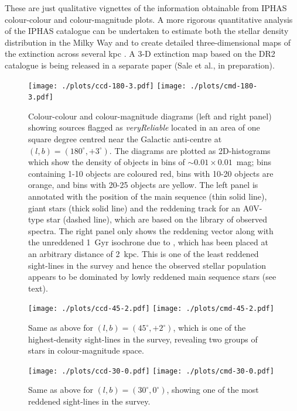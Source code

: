 \documentclass[useAMS,usenatbib]{mn2e}
\begin{document}
These are just qualitative vignettes of the information obtainable
from IPHAS colour-colour and colour-magnitude plots.
A more rigorous quantitative analysis of the IPHAS catalogue
can be undertaken to estimate both the stellar density distribution 
in the Milky Way \citep{Sale2010} and to create detailed three-dimensional 
maps of the extinction across several kpc \citep{Sale2009,Sale2012}.
A 3-D extinction map based on the DR2 catalogue
is being released in a separate paper (Sale et al., in preparation).

\begin{figure}
    \begin{minipage}[b]{\linewidth}
        \texttt{[image: ./plots/ccd-180-3.pdf]} 
        \texttt{[image: ./plots/cmd-180-3.pdf]}
    \end{minipage}
    \caption{Colour-colour and colour-magnitude diagrams
    (left and right panel)
    showing sources flagged as \emph{veryReliable}
    located in an area of one square degree
    centred near the Galactic anti-centre 
    at $(l,b)=(180^\circ,+3^\circ)$.
    The diagrams are plotted as 2D-histograms
    which show the density of objects
    in bins of $\sim0.01\times0.01$~mag;
    bins containing 1-10 objects are coloured red,
    bins with 10-20 objects are orange,
    and bins with 20-25 objects are yellow.
    The left panel is annotated with
    the position of the main sequence (thin solid line),
    giant stars (thick solid line)
    and the reddening track for an A0V-type star (dashed line),
    which are based on the \citet{Pickles1998} library
    of observed spectra.
    The right panel only shows the reddening vector
    along with the unreddened 1~Gyr isochrone due to \citet{Bressan2012},
    which has been placed at an arbitrary distance of 2~kpc.
    This is one of the least reddened sight-lines
    in the survey
    and hence the observed stellar population appears to be dominated 
    by lowly reddened main sequence stars (see text).}
    \label{fig:l180}
    \begin{minipage}[b]{\linewidth}
        \texttt{[image: ./plots/ccd-45-2.pdf]}
        \texttt{[image: ./plots/cmd-45-2.pdf]}
    \end{minipage}
    \caption{Same as above for $(l,b)=(45^\circ,+2^\circ)$,
    which is one of the highest-density sight-lines in the survey,
    revealing two groups of stars in colour-magnitude space.}
    \label{fig:l45}
    \begin{minipage}[b]{\linewidth}
        \texttt{[image: ./plots/ccd-30-0.pdf]}
        \texttt{[image: ./plots/cmd-30-0.pdf]} 
    \end{minipage}
    \caption{Same as above for $(l,b)=(30^\circ,0^\circ)$,
    showing one of the most reddened sight-lines in the survey.
    }
    \label{fig:l30}
\end{figure}
\end{document}

